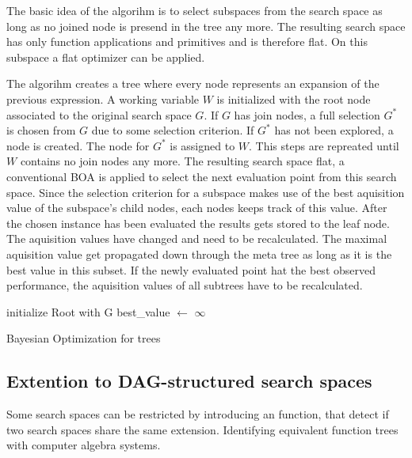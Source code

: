 \documentclass[english]{article}
\begin{document}
The basic idea of the algorihm is to select subspaces from the search space as long as no joined node is presend in the tree any more. The resulting search space has only function applications and primitives and is therefore flat. On this subspace a flat optimizer can be applied.

The algorihm creates a tree where every node represents an expansion of the previous expression. A working variable $W$ is initialized with the root node associated to the original search space $G$. If $G$ has join nodes, a full selection $G^*$ is chosen from $G$ due to some selection criterion. If $G^*$ has not been explored, a node is created. The node for $G^*$ is assigned to $W$. This steps are repreated until $W$ contains no join nodes any more. The resulting search space flat, a conventional \ac{BOA} is applied to select the next evaluation point from this search space. Since the selection criterion for a subspace makes use of the best aquisition value of the subspace's child nodes, each nodes keeps track of this value. After the chosen instance has been evaluated the results gets stored to the leaf node. The aquisition values have changed and need to be recalculated. The maximal aquisition value get propagated down through the meta tree as long as it is the best value in this subset. If the newly evaluated point hat the best observed performance, the aquisition values of all subtrees have to be recalculated.



\begin{algorithm}[H]
\SetAlgoLined
initialize Root with G\;
best\_value $\leftarrow$ $\infty$\;


\caption{Bayesian Optimization for trees}

\end{algorithm}
%


\subsection{Extention to DAG-structured search spaces}
Some search spaces can be restricted by introducing an function, that detect if two search spaces share the same extension. 
Identifying equivalent function trees with computer algebra systems.
\end{document}
